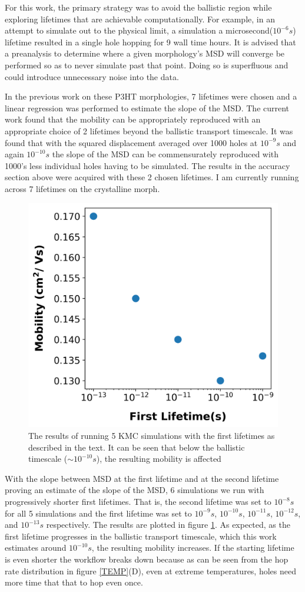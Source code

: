For this work, the primary strategy was to avoid the ballistic region while exploring lifetimes
that are achievable computationally. For example, in an attempt to simulate out to the physical limit, a
simulation a microsecond($10^{-6}s$) lifetime resulted in a single hole hopping for 9 wall time hours.
It is advised that a preanalysis to determine where a given morphology's MSD will converge be performed so as
to never simulate past that point. Doing so is superfluous and could introduce unnecessary noise into the data. 

In the previous work on these P3HT morphologies, 7 lifetimes were chosen and a linear regression was performed
to estimate the slope of the MSD. The current work found that the mobility can be appropriately reproduced
with an appropriate choice of 2 lifetimes beyond the ballistic transport timescale. It was found that with the 
squared displacement averaged over 1000 holes at $10^{-9}s$ and again $10^{-10}s$ the slope of the MSD can be
commensurately reproduced with 1000's less individual holes having to be simulated. The results in the accuracy
section above were acquired with these 2 chosen lifetimes. I am currently running across 7 lifetimes on the
crystalline morph. 

\begin{figure}
  \center
  \includegraphics[width=0.6\linewidth]{figures/lifetime.png} 
    \caption{The results of running 5 KMC simulations with the first lifetimes as described in the text. It
    can be seen that below the ballistic timescale (${\sim}10^{-10}s$), the resulting mobility is affected}
  \label{lifetime}
\end{figure}

With the slope between MSD at the first lifetime and at the second lifetime proving an estimate of the slope
of the MSD, 6 simulations we run with progressively shorter first lifetimes. That is, the second lifetime was
set to $10^{-8}s$ for all 5 simulations and the first lifetime was set to $10^{-9}s$, $10^{-10}s$,
$10^{-11}s$, $10^{-12}s$, and $10^{-13}s$ respectively. The results are plotted in figure
\ref{lifetime}. As expected, as the first lifetime progresses in the ballistic transport timescale, which this work
estimates around $10^{-10}s$, the resulting mobility increases. If the starting lifetime is even shorter the
workflow breaks down because as can be seen from the hop rate distribution in figure \ref{TEMP}(D), even at
extreme temperatures, holes need more time that that to hop even once. 

